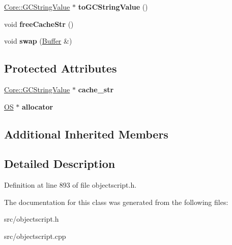 \begin{DoxyCompactItemize}
\item 
\hyperlink{struct_object_script_1_1_o_s_1_1_core_1_1_g_c_string_value}{Core\+::\+G\+C\+String\+Value} $\ast$ {\bfseries to\+G\+C\+String\+Value} ()\hypertarget{class_object_script_1_1_o_s_1_1_core_1_1_buffer_ac296c88cef4e7b15d8499a5c123fa705}{}\label{class_object_script_1_1_o_s_1_1_core_1_1_buffer_ac296c88cef4e7b15d8499a5c123fa705}

\item 
void {\bfseries free\+Cache\+Str} ()\hypertarget{class_object_script_1_1_o_s_1_1_core_1_1_buffer_aa88979ecfa30ee2064b01f5d09b7258b}{}\label{class_object_script_1_1_o_s_1_1_core_1_1_buffer_aa88979ecfa30ee2064b01f5d09b7258b}

\item 
void {\bfseries swap} (\hyperlink{class_object_script_1_1_o_s_1_1_core_1_1_buffer}{Buffer} \&)\hypertarget{class_object_script_1_1_o_s_1_1_core_1_1_buffer_a04caa2941031fd93b501e311ee44b3fa}{}\label{class_object_script_1_1_o_s_1_1_core_1_1_buffer_a04caa2941031fd93b501e311ee44b3fa}

\end{DoxyCompactItemize}
\subsection*{Protected Attributes}
\begin{DoxyCompactItemize}
\item 
\hyperlink{struct_object_script_1_1_o_s_1_1_core_1_1_g_c_string_value}{Core\+::\+G\+C\+String\+Value} $\ast$ {\bfseries cache\+\_\+str}\hypertarget{class_object_script_1_1_o_s_1_1_core_1_1_buffer_a33511b82ccd3415db935e36a0264a4c2}{}\label{class_object_script_1_1_o_s_1_1_core_1_1_buffer_a33511b82ccd3415db935e36a0264a4c2}

\item 
\hyperlink{class_object_script_1_1_o_s}{OS} $\ast$ {\bfseries allocator}\hypertarget{class_object_script_1_1_o_s_1_1_core_1_1_buffer_aa8ba65d199cd673def926b1a629fc892}{}\label{class_object_script_1_1_o_s_1_1_core_1_1_buffer_aa8ba65d199cd673def926b1a629fc892}

\end{DoxyCompactItemize}
\subsection*{Additional Inherited Members}


\subsection{Detailed Description}


Definition at line 893 of file objectscript.\+h.



The documentation for this class was generated from the following files\+:\begin{DoxyCompactItemize}
\item 
src/objectscript.\+h\item 
src/objectscript.\+cpp\end{DoxyCompactItemize}
